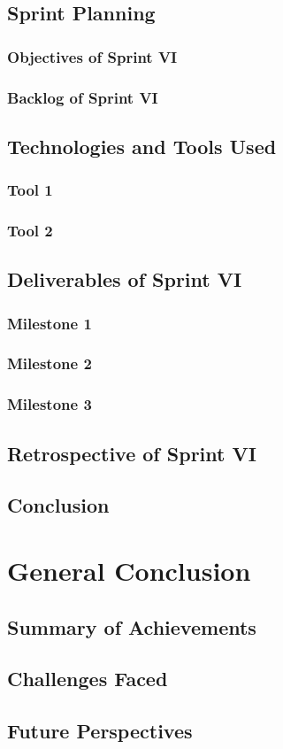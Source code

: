 \documentclass[a4paper,12pt]{report}
\begin{document}
\section{Sprint Planning}
\subsection{Objectives of Sprint VI}
\subsection{Backlog of Sprint VI}
\section{Technologies and Tools Used}
\subsection{Tool 1}
\subsection{Tool 2}
\section{Deliverables of Sprint VI}
\subsection{Milestone 1}
\subsection{Milestone 2}
\subsection{Milestone 3}
\section{Retrospective of Sprint VI}
\section{Conclusion}


\chapter{General Conclusion}

\section{Summary of Achievements}
\section{Challenges Faced}
\section{Future Perspectives}


\end{document}
